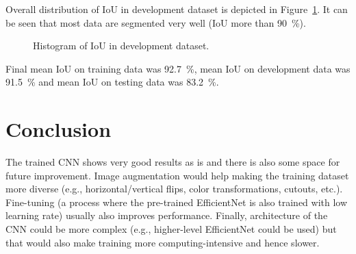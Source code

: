 \documentclass[9pt]{IEEEtran}
\begin{document}
Overall distribution of IoU in development dataset is depicted in Figure~\ref{fig:hist}.
It can be seen that most data are segmented very well (IoU more than 90~\%).

\begin{figure}
    \centering
    \caption{Histogram of IoU in development dataset.}
    \label{fig:hist}
\end{figure}

Final mean IoU on training data was 92.7~\%, mean IoU on development data was 91.5~\% and mean IoU on testing data was 83.2~\%.

\section{Conclusion}
The trained CNN shows very good results as is and there is also some space for future improvement.
Image augmentation would help making the training dataset more diverse (e.g., horizontal/vertical flips, color transformations, cutouts, etc.).
Fine-tuning (a process where the pre-trained EfficientNet is also trained with low learning rate) usually also improves performance.
Finally, architecture of the CNN could be more complex (e.g., higher-level EfficientNet could be used) but that would also make training more computing-intensive and hence slower.



\end{document}
